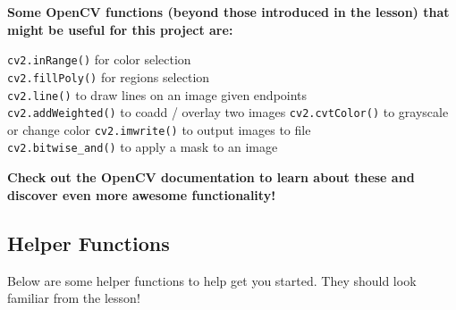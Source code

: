\documentclass[11pt]{article}
\begin{document}
    \textbf{Some OpenCV functions (beyond those introduced in the lesson)
that might be useful for this project are:}

\texttt{cv2.inRange()} for color selection\\
\texttt{cv2.fillPoly()} for regions selection\\
\texttt{cv2.line()} to draw lines on an image given endpoints\\
\texttt{cv2.addWeighted()} to coadd / overlay two images
\texttt{cv2.cvtColor()} to grayscale or change color
\texttt{cv2.imwrite()} to output images to file\\
\texttt{cv2.bitwise\_and()} to apply a mask to an image

\textbf{Check out the OpenCV documentation to learn about these and
discover even more awesome functionality!}

    \hypertarget{helper-functions}{%
\subsection{Helper Functions}\label{helper-functions}}

    Below are some helper functions to help get you started. They should
look familiar from the lesson!
\end{document}
